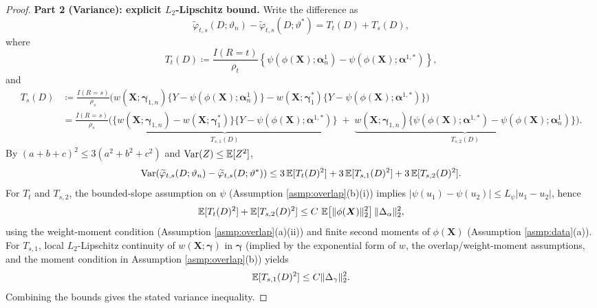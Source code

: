 \documentclass{article}
\begin{document}
\begin{proof}
\textbf{Part 2 (Variance): explicit $L_2$-Lipschitz bound.}
Write the difference as
\[
\widetilde{\varphi}_{t,s}(D;\vartheta_n)-\widetilde{\varphi}_{t,s}(D;\vartheta^*)
=
T_t(D)+T_s(D),
\]
where
\[
T_t(D)\coloneqq \frac{I(R=t)}{\rho_t}\left\{\psi(\phi(\boldsymbol{X});\boldsymbol{\alpha}_n^1)-\psi(\phi(\boldsymbol{X});\boldsymbol{\alpha}^{1,*})\right\},
\]
and
\[
\begin{aligned}
T_s(D)
&\coloneqq \frac{I(R=s)}{\rho_s}\Big(
w(\boldsymbol{X};\boldsymbol{\gamma}_{1,n})\{Y-\psi(\phi(\boldsymbol{X});\boldsymbol{\alpha}_n^1)\}
-w(\boldsymbol{X};\boldsymbol{\gamma}_1^*)\{Y-\psi(\phi(\boldsymbol{X});\boldsymbol{\alpha}^{1,*})\}
\Big) \\
&= \frac{I(R=s)}{\rho_s}\Big(
\underbrace{\{w(\boldsymbol{X};\boldsymbol{\gamma}_{1,n})-w(\boldsymbol{X};\boldsymbol{\gamma}_1^*)\}\{Y-\psi(\phi(\boldsymbol{X});\boldsymbol{\alpha}^{1,*})\}}_{T_{s,1}(D)}
\;+\;
\underbrace{w(\boldsymbol{X};\boldsymbol{\gamma}_{1,n})\{\psi(\phi(\boldsymbol{X});\boldsymbol{\alpha}^{1,*})-\psi(\phi(\boldsymbol{X});\boldsymbol{\alpha}_n^1)\}}_{T_{s,2}(D)}
\Big).
\end{aligned}
\]
By $(a+b+c)^2\le 3(a^2+b^2+c^2)$ and $\operatorname{Var}(Z)\le \operatorname{\mathbb{E}}[Z^2]$,
\[
\operatorname{Var}\!\left(\widetilde{\varphi}_{t,s}(D;\vartheta_n)-\widetilde{\varphi}_{t,s}(D;\vartheta^*)\right)
\le
3\operatorname{\mathbb{E}}[T_t(D)^2]+3\operatorname{\mathbb{E}}[T_{s,1}(D)^2]+3\operatorname{\mathbb{E}}[T_{s,2}(D)^2].
\]
For $T_t$ and $T_{s,2}$, the bounded-slope assumption on $\psi$ (Assumption \ref{asmp:overlap}(b)(i)) implies
$|\psi(u_1)-\psi(u_2)|\le L_\psi|u_1-u_2|$, hence
\[
\operatorname{\mathbb{E}}[T_t(D)^2]+\operatorname{\mathbb{E}}[T_{s,2}(D)^2]
\le
C\,\operatorname{\mathbb{E}}\!\left[\|\phi(\boldsymbol{X})\|_2^2\right]\|\Delta_\alpha\|_2^2,
\]
using the weight-moment condition (Assumption \ref{asmp:overlap}(a)(ii)) and finite second moments of $\phi(\boldsymbol{X})$ (Assumption \ref{asmp:data}(a)).
For $T_{s,1}$, local $L_2$-Lipschitz continuity of $w(\boldsymbol{X};\boldsymbol{\gamma})$ in $\boldsymbol{\gamma}$ (implied by the exponential form of $w$, the overlap/weight-moment assumptions, and the moment condition in Assumption \ref{asmp:overlap}(b)) yields
\[
\operatorname{\mathbb{E}}[T_{s,1}(D)^2]
\le
C\|\Delta_\gamma\|_2^2.
\]
Combining the bounds gives the stated variance inequality.
\end{proof}
\end{document}
